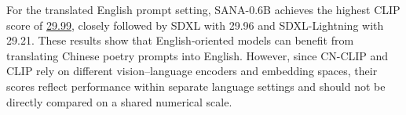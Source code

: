 For the translated English prompt setting, SANA-0.6B achieves the highest CLIP score of \underline{29.99}, closely followed by SDXL with 29.96 and SDXL-Lightning with 29.21. These results show that English-oriented models can benefit from translating Chinese poetry prompts into English. However, since CN-CLIP and CLIP rely on different vision--language encoders and embedding spaces, their scores reflect performance within separate language settings and should not be directly compared on a shared numerical scale.



